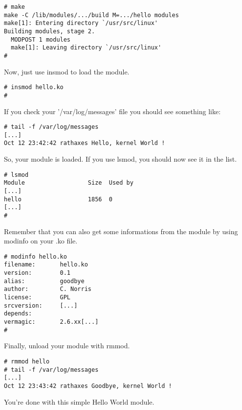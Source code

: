 \documentclass{article}
\begin{document}
\lstset{language=sh, numbers=none}
\begin{lstlisting}
# make
make -C /lib/modules/.../build M=.../hello modules
make[1]: Entering directory `/usr/src/linux'
Building modules, stage 2.
  MODPOST 1 modules
  make[1]: Leaving directory `/usr/src/linux'
# 
\end{lstlisting}
Now, just use insmod to load the module.
\begin{lstlisting}
# insmod hello.ko
# 
\end{lstlisting}
If you check your '/var/log/messages' file you should see something like:
\begin{lstlisting}
# tail -f /var/log/messages
[...]
Oct 12 23:42:42 rathaxes Hello, kernel World !
\end{lstlisting}
So, your module is loaded.
If you use lsmod, you should now see it in the list.
\begin{lstlisting}
# lsmod
Module                  Size  Used by
[...]
hello                   1856  0
[...]
#
\end{lstlisting}
Remember that you can also get some informations from the module
by using modinfo on your .ko file.
\begin{lstlisting}
# modinfo hello.ko
filename:       hello.ko
version:        0.1
alias:          goodbye
author:         C. Norris
license:        GPL
srcversion:     [...]
depends:        
vermagic:       2.6.xx[...]
# 
\end{lstlisting}
Finally, unload your module with rmmod.
\begin{lstlisting}
# rmmod hello
# tail -f /var/log/messages
[...]
Oct 12 23:43:42 rathaxes Goodbye, kernel World !
\end{lstlisting}
You're done with this simple Hello World module.
\end{document}
